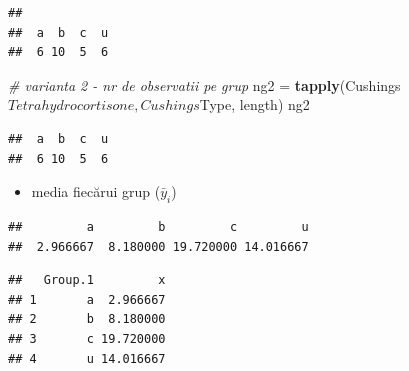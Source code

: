\documentclass[]{article}
\newenvironment{Shaded}{\begin{snugshade}}{\end{snugshade}}
\newcommand{\KeywordTok}[1]{\textcolor[rgb]{0.13,0.29,0.53}{\textbf{{#1}}}}
\newcommand{\DataTypeTok}[1]{\textcolor[rgb]{0.13,0.29,0.53}{{#1}}}
\newcommand{\StringTok}[1]{\textcolor[rgb]{0.31,0.60,0.02}{{#1}}}
\newcommand{\CommentTok}[1]{\textcolor[rgb]{0.56,0.35,0.01}{\textit{{#1}}}}
\newcommand{\NormalTok}[1]{{#1}}
\providecommand{\tightlist}{%
  \setlength{\itemsep}{0pt}\setlength{\parskip}{0pt}}
\begin{document}
\begin{verbatim}
## 
##  a  b  c  u 
##  6 10  5  6
\end{verbatim}

\begin{Shaded}
\begin{Highlighting}[]
\CommentTok{# varianta 2 - nr de observatii pe grup}
\NormalTok{ng2 =}\StringTok{ }\KeywordTok{tapply}\NormalTok{(Cushings$Tetrahydrocortisone, Cushings$Type, length)}
\NormalTok{ng2}
\end{Highlighting}
\end{Shaded}

\begin{verbatim}
##  a  b  c  u 
##  6 10  5  6
\end{verbatim}

\begin{itemize}
\tightlist
\item
  media fiecărui grup (\(\bar{y}_i\))
\end{itemize}

\begin{Shaded}
\end{Shaded}

\begin{verbatim}
##         a         b         c         u 
##  2.966667  8.180000 19.720000 14.016667
\end{verbatim}

\begin{Shaded}
\end{Shaded}

\begin{verbatim}
##   Group.1         x
## 1       a  2.966667
## 2       b  8.180000
## 3       c 19.720000
## 4       u 14.016667
\end{verbatim}
\end{document}

